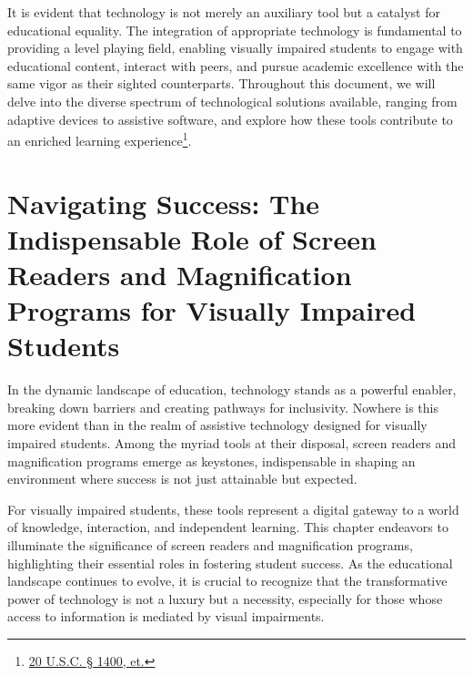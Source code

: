 \documentclass[14pt,letterpaper,twoside]{extreport}
\begin{document}
It is evident that technology is not merely an auxiliary tool but a catalyst for educational equality. The integration of appropriate technology is fundamental to providing a level playing field, enabling visually impaired students to engage with educational content, interact with peers, and pursue academic excellence with the same vigor as their sighted counterparts. Throughout this document, we will delve into the diverse spectrum of technological solutions available, ranging from adaptive devices to assistive software, and explore how these tools contribute to an enriched learning experience\footnote{\href{https://sites.ed.gov/idea/statuteregulations/}{20 U.S.C. § 1400, et.}}.

\pagebreak
\fancyhead[RO]{\textit{\lastxmark}}
\fancyhead[LE]{\textit{\firstxmark}}
\fancyfoot[C]{}

\hypertarget{vision-assistive-technology-laptop-computer-requirements}{}\chapter[\raggedright Navigating Success:  \\ The Indispensable Role of Screen Readers and Magnification Programs for Visually Impaired Students]{Navigating Success: The Indispensable Role of Screen Readers and Magnification Programs for Visually Impaired Students}\label{vision-assistive-technology-laptop-computer-requirements}
\minitoc \newpage

In the dynamic landscape of education, technology stands as a powerful enabler, breaking down barriers and creating pathways for inclusivity. Nowhere is this more evident than in the realm of assistive technology designed for visually impaired students. Among the myriad tools at their disposal, screen readers and magnification programs emerge as keystones, indispensable in shaping an environment where success is not just attainable but expected.

For visually impaired students, these tools represent a digital gateway to a world of knowledge, interaction, and independent learning. This chapter endeavors to illuminate the significance of screen readers and magnification programs, highlighting their essential roles in fostering student success. As the educational landscape continues to evolve, it is crucial to recognize that the transformative power of technology is not a luxury but a necessity, especially for those whose access to information is mediated by visual impairments.
\end{document}

